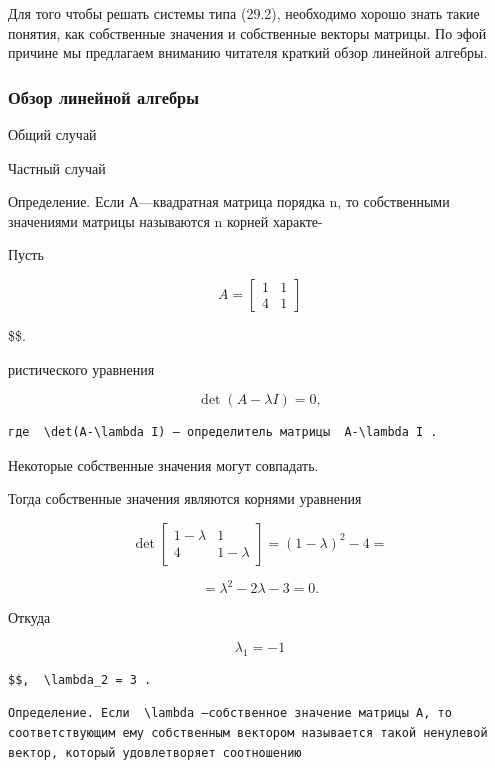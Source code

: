 \documentclass[
  ukrainian,
]{article}
\begin{document}
Для того чтобы решать системы типа (29.2), необходимо хорошо знать такие
понятия, как собственные значения и собственные векторы матрицы. По эфой
причине мы предлагаем вниманию читателя краткий обзор линейной алгебры.

\subsubsection{Обзор линейной
алгебры}\label{ux43eux431ux437ux43eux440-ux43bux438ux43dux435ux439ux43dux43eux439-ux430ux43bux433ux435ux431ux440ux44b}

Общий случай

Частный случай

Определение. Если А---квадратная матрица порядка n, то собственными
значениями матрицы называются n корней характе-

Пусть

\[
A = \begin{bmatrix} 1 & 1 \\ 4 & 1 \end{bmatrix}
\]

\$\$.

ристического уравнения

\[
\det\left(A-\lambda I\right)=0,
\]

\begin{verbatim}
где  \det(A-\lambda I) — определитель матрицы  A-\lambda I .
\end{verbatim}

Некоторые собственные значения могут совпадать.

Тогда собственные значения являются корнями уравнения

\[
\det \begin{bmatrix} 1-\lambda & 1\\ 4 & 1-\lambda \end{bmatrix} = (1-\lambda)^2 - 4 =
\]

\[
= \lambda^2 - 2\lambda - 3 = 0.
\]

Откуда

\[
\lambda_1 = -1
\]

\begin{verbatim}
$$,  \lambda_2 = 3 .
\end{verbatim}

\begin{verbatim}
Определение. Если  \lambda —собственное значение матрицы A, то соответствующим ему собственным вектором называется такой ненулевой вектор, который удовлетворяет соотношению
\end{verbatim}
\end{document}
